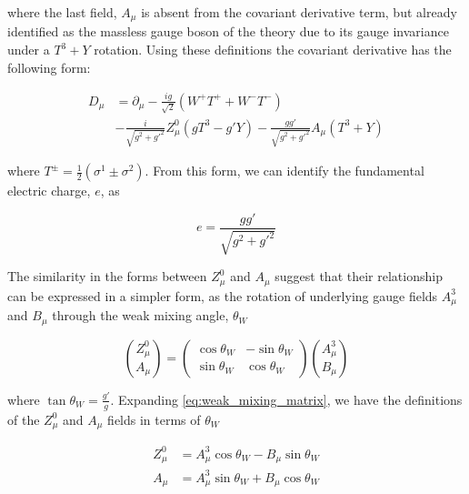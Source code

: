 \noindent where the last field, $A_{\mu}$ is absent from the covariant
derivative term, but already identified as the massless gauge boson of
the theory due to its gauge invariance under a $T^{3}+Y$ rotation.
Using these definitions the covariant derivative has the following
form:

\begin{equation}\label{eq:ewk_covariant_derivative_mass_eigenstates}
\begin{aligned}
D_{\mu} & = \partial_{\mu} - \frac{ig}{\sqrt{2}}(W^{+}T^{+} + W^{-}T^{-}) \\
  &  - \frac{i}{\sqrt{g^{2}+g'^{2}}}Z_{\mu}^{0}(gT^{3} - g'Y) -
    \frac{gg'}{\sqrt{g^{2}+g'^{2}}}A_{\mu}(T^{3}+Y) 
\end{aligned}
\end{equation} 

\noindent where $T^{\pm} = \frac{1}{2}(\sigma^{1}\pm\sigma^{2})$.  From
this form, we can identify the fundamental electric charge, $e$, as

\begin{equation}\label{eq:ewk_electric_charge}
e = \frac{gg'}{\sqrt{g^{2}+g'^{2}}}
\end{equation}

The similarity in the forms between $Z_{\mu}^{0}$ and $A_{\mu}$
suggest that their relationship can be expressed in a simpler form, as
the rotation of underlying gauge fields $A_{\mu}^{3}$ and $B_{\mu}$
through the weak mixing angle, $\theta_{W}$

\begin{equation}\label{eq:weak_mixing_matrix}
\binom{Z_{\mu}^{0}}{A_{\mu}} = 
\begin{pmatrix}
    \cos{\theta_{W}} & -\sin{\theta_{W}} \\
    \sin{\theta_{W}}  &  \cos{\theta_{W}}
  \end{pmatrix}
\binom{A_{\mu}^{3}}{B_{\mu}}
\end{equation}

\noindent where $\tan{\theta_{W}} = \frac{g'}{g}$.  Expanding
\ref{eq:weak_mixing_matrix}, we have the definitions of the
$Z_{\mu}^{0}$ and $A_{\mu}$ fields in terms of $\theta_{W}$

\begin{equation}\label{eq:ewk_Z_A_defined_with_thetaW}
\begin{aligned}
Z_{\mu}^{0} &= A_{\mu}^{3}\cos{\theta_{W}} - B_{\mu}\sin{\theta_{W}}
\\
A_{\mu} & = A_{\mu}^{3}\sin{\theta_{W}} + B_{\mu}\cos{\theta_{W}}
\end{aligned}
\end{equation}

